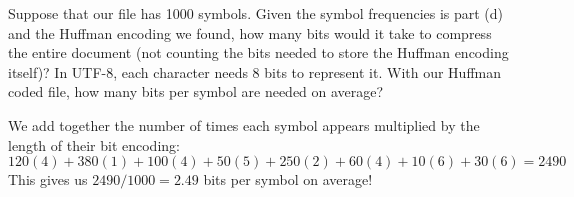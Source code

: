 \begin{parts}
    \pagebreak
    \item Suppose that our file has 1000 symbols. Given the symbol frequencies is part (d) and the Huffman encoding we found, how many bits would it take to compress the entire document (not counting the bits needed to store the Huffman encoding itself)? In UTF-8, each character needs 8 bits to represent it. With our Huffman coded file, how many bits per symbol are needed on average?

    \begin{solution}[1in]
        We add together the number of times each symbol appears multiplied by the length of their bit encoding:
        $$120(4) + 380(1) + 100(4) + 50(5) + 250(2) + 60(4) + 10(6) + 30(6) = 2490$$
        This gives us $2490 / 1000 = 2.49$ bits per symbol on average!
    \end{solution}
\end{parts}
